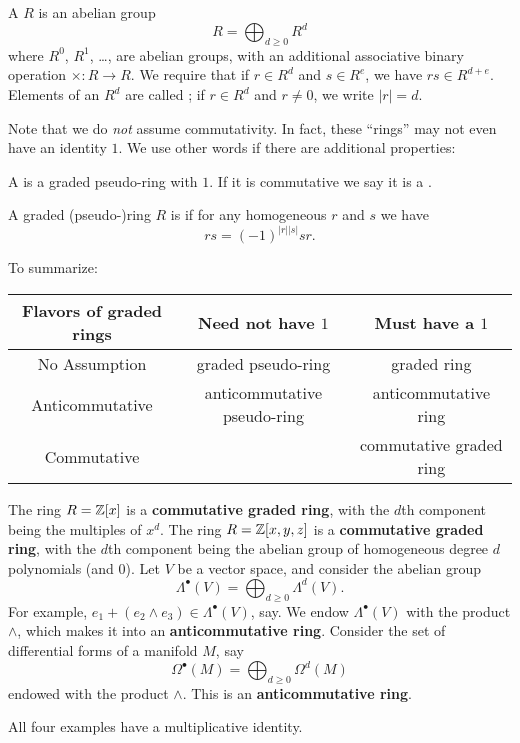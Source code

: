 \begin{definition}
	A  $R$ is an abelian group
	\[ R = \bigoplus_{d \ge 0} R^d \]
	where $R^0$, $R^1$, \dots, are abelian groups,
	with an additional associative binary operation $\times \colon R \to R$.
	We require that if $r \in R^d$ and $s \in R^e$, we have $rs \in R^{d+e}$.
	Elements of an $R^d$ are called ;
	if $r \in R^d$ and $r \neq 0$, we write $|r| = d$.
\end{definition}
Note that we do \emph{not} assume commutativity.
In fact, these ``rings'' may not even have an identity $1$.
We use other words if there are additional properties:
\begin{definition}
	A  is a graded pseudo-ring with $1$.
	If it is commutative we say it is a .
\end{definition}
\begin{definition}
	A graded (pseudo-)ring $R$ is  if
	for any homogeneous $r$ and $s$ we have
	\[ rs = (-1)^{|r| |s|} sr. \]
\end{definition}

To summarize:
\begin{center}
	\small
	\begin{tabular}[h]{|c|cc|}
		\hline
		\textbf{Flavors of graded rings} &
		Need not have $1$ & Must have a $1$ \\ \hline
		No Assumption & graded pseudo-ring & graded ring \\
		Anticommutative & anticommutative pseudo-ring & anticommutative ring \\
		Commutative &  & commutative graded ring \\ \hline
	\end{tabular}
\end{center}

\begin{example}
	\listhack
	\begin{enumerate}[(a)]
		\ii The ring $R = \mathbb Z[x]$ is a \textbf{commutative graded ring},
		with the $d$th component being the multiples of $x^d$.
		\ii The ring $R = \mathbb Z[x,y,z]$ is a \textbf{commutative graded ring},
		with the $d$th component being the abelian group
		of homogeneous degree $d$ polynomials (and $0$).
		\ii Let $V$ be a vector space, and consider
		the abelian group
		\[ \Lambda^\bullet(V) = \bigoplus_{d \ge 0} \Lambda^d(V). \]
		For example, $e_1 + (e_2 \wedge e_3) \in \Lambda^\bullet(V)$, say.
		We endow $\Lambda^\bullet(V)$ with the product $\wedge$,
		which makes it into an \textbf{anticommutative ring}.
		\ii Consider the set of differential forms of a manifold $M$,
		say \[ \Omega^\bullet(M) = \bigoplus_{d \ge 0} \Omega^d(M) \]
		endowed with the product $\wedge$.
		This is an \textbf{anticommutative ring}.
	\end{enumerate}
	All four examples have a multiplicative identity.
\end{example}

